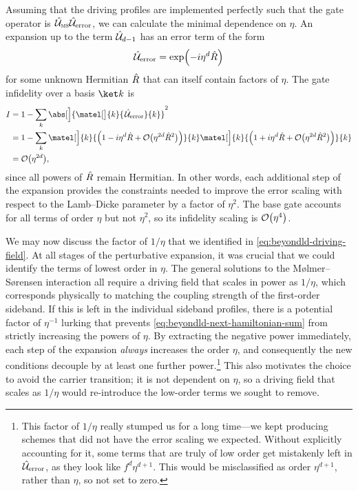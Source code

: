 Assuming that the driving profiles are implemented perfectly such that the gate operator is $\U_\ms\U_{\text{error}}$, we can calculate the minimal dependence on $\eta$.
An expansion up to the term $\U_{d-1}$ has an error term of the form
\begin{equation}
\U_{\text{error}} = \exp\Bigl(-i\eta^d\op R\Bigr)
\end{equation}
for some unknown Hermitian $\op R$ that can itself contain factors of $\eta$.
The gate infidelity over a basis $\ket k$ is
\begin{equation}\begin{aligned}
I
    &= 1 - \sum_k \abs[\Big]{\matel[\big]{k}{\mkern2mu\U_{\text{error}}}{k}}^2\\
    &= 1 - \sum_k \matel[\Big]{k}{\Bigl(1 - i\eta^d\op R + \order[\big]{\eta^{2d}\op R^2}\Bigr)}{k} \matel[\Big]{k}{\Bigl(1 + i\eta^d\op R + \order[\big]{\eta^{2d}\op R^2}\Bigr)}{k}\\
    &= \order[\big]{\eta^{2d}},
\end{aligned}\end{equation}
since all powers of $\op R$ remain Hermitian.
In other words, each additional step of the expansion provides the constraints needed to improve the error scaling with respect to the Lamb--Dicke parameter by a factor of $\eta^2$.
The base gate accounts for all terms of order $\eta$ but not $\eta^2$, so its infidelity scaling is $\order[\big]{\eta^4}$.

We may now discuss the factor of $1/\eta$ that we identified in \cref{eq:beyondld-driving-field}.
At all stages of the perturbative expansion, it was crucial that we could identify the terms of lowest order in $\eta$.
The general solutions to the M\o lmer--S\o rensen interaction all require a driving field that scales in power as $1/\eta$, which corresponds physically to matching the coupling strength of the first-order sideband.
If this is left in the individual sideband profiles, there is a potential factor of $\eta^{-1}$ lurking that prevents \cref{eq:beyondld-next-hamiltonian-sum} from strictly increasing the powers of $\eta$.
By extracting the negative power immediately, each step of the expansion \emph{always} increases the order $\eta$, and consequently the new conditions decouple by at least one further power.\footnote{
    This factor of $1/\eta$ really stumped us for a long time---we kept producing schemes that did not have the error scaling we expected.
    Without explicitly accounting for it, some terms that are truly of low order get mistakenly left in $\U_{\text{error}}$, as they look like $f^d \eta^{d+1}$.
    This would be misclassified as order $\eta^{d+1}$, rather than $\eta$, so not set to zero.
}
This also motivates the choice to avoid the carrier transition; it is not dependent on $\eta$, so a driving field that scales as $1/\eta$ would re-introduce the low-order terms we sought to remove.

